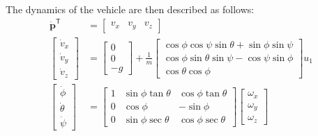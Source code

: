 \documentclass[letterpaper, 10 pt, conference]{ieeeconf}  %
\begin{document}
The dynamics of the vehicle are then described as follows:
\begin{equation}
	\begin{aligned}
	\dot{\bm{p}}^{\mathsf{T}} &= \begin{bmatrix}v_x & v_y & v_z\end{bmatrix}\\
	\begin{bmatrix}\dot{v}_x \\ \dot{v}_y \\ \dot{v}_z\end{bmatrix} &= \begin{bmatrix}0 \\ 0 \\ -g \end{bmatrix} + \frac{1}{m} \begin{bmatrix}\cos\phi \cos\psi \sin\theta + \sin\phi \sin\psi \\ \cos\phi \sin\theta \sin\psi - \cos\psi \sin\phi \\ \cos\theta \cos\phi \end{bmatrix} u_1\\
	\begin{bmatrix}\dot{\phi} \\ \dot{\theta} \\ \dot{\psi}\end{bmatrix} &= \begin{bmatrix}1 & \sin\phi \tan\theta & \cos\phi \tan\theta\\ 0 & \cos\phi & -\sin\phi \\ 0 & \sin\phi \sec\theta & \cos\phi \sec\theta \end{bmatrix} \begin{bmatrix}\omega_{x} \\ \omega_{y} \\ \omega_{z} \end{bmatrix}\\

\end{aligned}
\end{equation}
\end{document}

